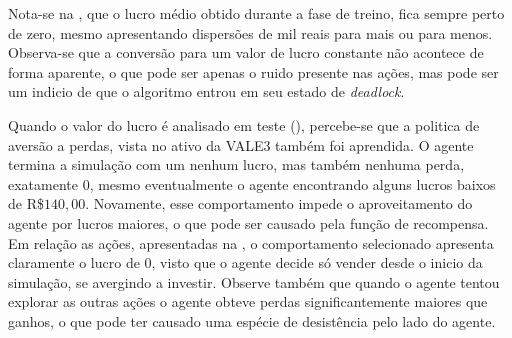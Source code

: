 Nota-se na , que o lucro médio obtido durante a fase de treino, fica sempre perto de zero, mesmo apresentando dispersões de mil reais para mais ou para menos. Observa-se que a conversão para um valor de lucro constante não acontece de forma aparente, o que pode ser apenas o ruido presente nas ações, mas pode ser um indicio de que o algoritmo entrou em seu estado de \emph{deadlock}.


Quando o valor do lucro é analisado em teste (), percebe-se que a politica de aversão a perdas, vista no ativo da VALE3 também foi aprendida. O agente termina a simulação com um nenhum lucro, mas também nenhuma perda, exatamente $0$, mesmo eventualmente o agente encontrando alguns lucros baixos de R\$$140,00$. Novamente, esse comportamento impede o aproveitamento do agente por lucros maiores, o que pode ser causado pela função de recompensa. Em relação as ações, apresentadas na , o comportamento selecionado apresenta claramente o lucro de $0$, visto que o agente decide só vender desde o inicio da simulação, se avergindo a investir. Observe também que quando o agente tentou explorar as outras ações o agente obteve perdas significantemente maiores que ganhos, o que pode ter causado uma espécie de desistência pelo lado do agente. 

